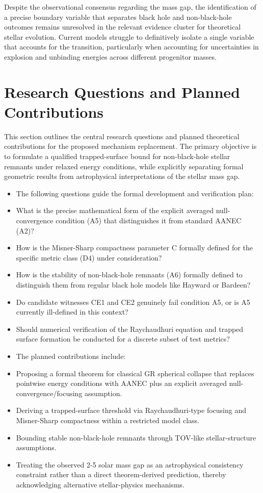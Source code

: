 \documentclass[conference]{IEEEtran}
\begin{document}
Despite the observational consensus regarding the mass gap, the identification of a precise boundary variable that separates black hole and non-black-hole outcomes remains unresolved in the relevant evidence cluster for theoretical stellar evolution. Current models struggle to definitively isolate a single variable that accounts for the transition, particularly when accounting for uncertainties in explosion and unbinding energies across different progenitor masses.

\section{Research Questions and Planned Contributions}
This section outlines the central research questions and planned theoretical contributions for the proposed mechanism replacement. The primary objective is to formulate a qualified trapped-surface bound for non-black-hole stellar remnants under relaxed energy conditions, while explicitly separating formal geometric results from astrophysical interpretations of the stellar mass gap.

\begin{itemize}
\item The following questions guide the formal development and verification plan:
\item What is the precise mathematical form of the explicit averaged null-convergence condition (A5) that distinguishes it from standard AANEC (A2)?
\item How is the Misner-Sharp compactness parameter C formally defined for the specific metric class (D4) under consideration?
\item How is the stability of non-black-hole remnants (A6) formally defined to distinguish them from regular black hole models like Hayward or Bardeen?
\item Do candidate witnesses CE1 and CE2 genuinely fail condition A5, or is A5 currently ill-defined in this context?
\item Should numerical verification of the Raychaudhuri equation and trapped surface formation be conducted for a discrete subset of test metrics?
\end{itemize}

\begin{itemize}
\item The planned contributions include:
\item Proposing a formal theorem for classical GR spherical collapse that replaces pointwise energy conditions with AANEC plus an explicit averaged null-convergence/focusing assumption.
\item Deriving a trapped-surface threshold via Raychaudhuri-type focusing and Misner-Sharp compactness within a restricted model class.
\item Bounding stable non-black-hole remnants through TOV-like stellar-structure assumptions.
\item Treating the observed 2-5 solar mass gap as an astrophysical consistency constraint rather than a direct theorem-derived prediction, thereby acknowledging alternative stellar-physics mechanisms.
\end{itemize}
\end{document}
